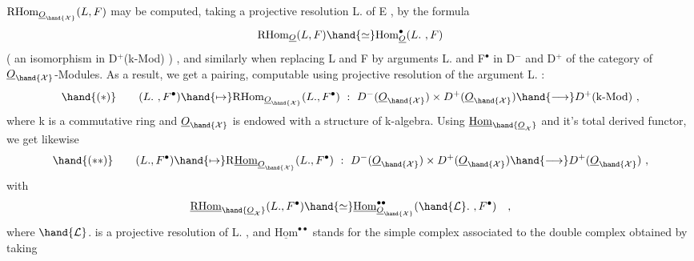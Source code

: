 $\mathrm{RHom}_{\underline{O}_{\hand{\mathcal{X}}}}(L,F)$ may be computed, taking a projective resolution L. of E ,
by the formula
\[ \mathrm{RHom}_{\underline{O}}(L,F) \hand{\simeq} \mathrm{Hom}^{\bullet}_{\underline{O}}(L. \ , F) \]
( an isomorphism in D$^{+}$(k-Mod)  ) , and similarly when replacing L and
F by arguments L. and F$^{\bullet}$ in D$^{-}$ and D$^{+}$ of the category of $\underline{O}_{\hand{\mathcal{X}}}$-Modules.
As a result, we get a pairing, computable  using projective resolution
of the argument L. :
\[ \hand{(*)} \qquad (L. \ , F^{\bullet}) \hand{\mapsto} \mathrm{RHom}_{\underline{O}_{\hand{\mathcal{X}}}}(L.,F^{\bullet}) \ : \ D^{-}(\underline{O}_{\hand{\mathcal{X}}}) \times D^{+}(\underline{O}_{\hand{\mathcal{X}}}) \hand{\longrightarrow} D^{+}(\text{k-Mod}) \ , \]
where k is a commutative ring and $\underline{O}_{\hand{\mathcal{X}}}$ is endowed with a structure of
k-algebra. Using $\underline{\mathrm{Hom}}_{\hand{\underline{O}_{\mathcal{X}}}}$ and it's total derived functor, we get likewise
\[ \hand{(**)} \qquad (L.,F^{\bullet}) \hand{\mapsto} \mathrm{R}\underline{\mathrm{Hom}}_{\underline{O}_{\hand{\mathcal{X}}}}(L.,F^{\bullet}) \ : \ D^{-}(\underline{O}_{\hand{\mathcal{X}}}) \times D^{+}(\underline{O}_{\hand{\mathcal{X}}}) \hand{\longrightarrow} D^{+}(\underline{O}_{\hand{\mathcal{X}}}) \ , \]
with
\[ \underline{\mathrm{RHom}}_{\hand{\underline{O}_{\mathcal{X}}}}(L.,F^{\bullet}) \hand{\simeq} \underline{\mathrm{Hom}}_{\underline{O}_{\hand{\mathcal{X}}}}^{\bullet\bullet}(\hand{\mathcal{L}}. \ , F^{\bullet}) \quad , \]
where $\hand{\mathcal{L}}$. is a projective resolution of L. , and $\underline{\mathrm{Hom}}^{\bullet\bullet}$ stands for
the simple complex associated to the double complex obtained by taking

